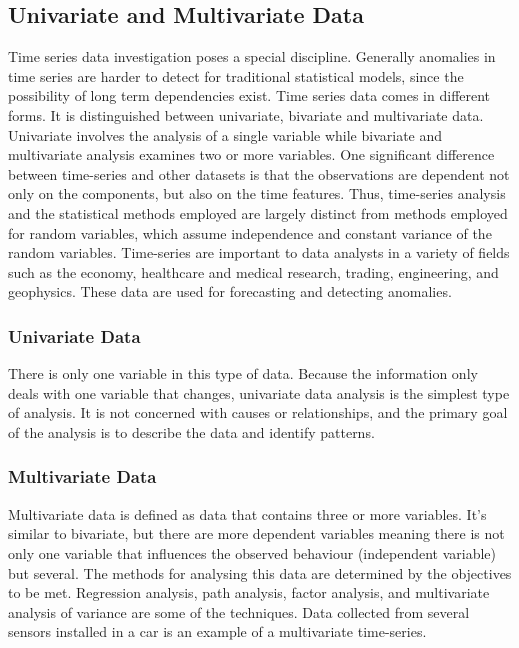 \subsection{Univariate and Multivariate Data}
Time series data investigation poses a special discipline. Generally anomalies in time series are harder to detect for traditional statistical models, since the possibility of long term dependencies exist. Time series data comes in different forms. It is distinguished between univariate, bivariate and multivariate data. Univariate involves the analysis of a single variable while bivariate and multivariate analysis examines two or more variables. One significant difference between time-series and other datasets is that the observations are dependent not only on the components, but also on the time features. Thus, time-series analysis and the statistical methods employed are largely distinct from methods employed for random variables, which assume independence and constant variance of the random variables. Time-series are important to data analysts in a variety of fields such as the economy, healthcare and medical research, trading, engineering, and geophysics. These data are used for forecasting and detecting anomalies.

\subsubsection{Univariate Data}
There is only one variable in this type of data. Because the information only deals with one variable that changes, univariate data analysis is the simplest type of analysis. It is not concerned with causes or relationships, and the primary goal of the analysis is to describe the data and identify patterns.


\subsubsection{Multivariate Data}
Multivariate data is defined as data that contains three or more variables. It's similar to bivariate, but there are more dependent variables meaning there is not only one variable that influences the observed behaviour (independent variable) but several. The methods for analysing this data are determined by the objectives to be met. Regression analysis, path analysis, factor analysis, and multivariate analysis of variance are some of the techniques. Data collected from several sensors installed in a car is an example of a multivariate time-series.


